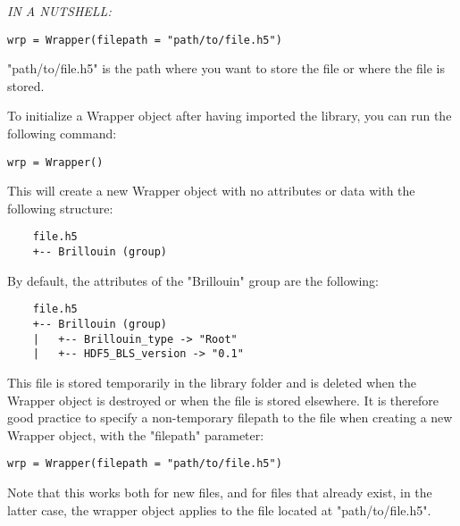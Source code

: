 \begin{tcolorbox}
\textit{IN A NUTSHELL:}
\begin{lstlisting}
wrp = Wrapper(filepath = "path/to/file.h5")
\end{lstlisting}
"path/to/file.h5" is the path where you want to store the file or where the file is stored.
\end{tcolorbox}


To initialize a Wrapper object after having imported the library, you can run the following command:
\begin{lstlisting}
wrp = Wrapper()
\end{lstlisting}

This will create a new Wrapper object with no attributes or data with the following structure:
\begin{verbatim}
    file.h5
    +-- Brillouin (group)
\end{verbatim}

By default, the attributes of the "Brillouin" group are the following:
\begin{verbatim}
    file.h5
    +-- Brillouin (group)
    |   +-- Brillouin_type -> "Root"
    |   +-- HDF5_BLS_version -> "0.1" 
\end{verbatim}

This file is stored temporarily in the library folder and is deleted when the Wrapper object is destroyed or when the file is stored elsewhere. It is therefore good practice to specify a non-temporary filepath to the file when creating a new Wrapper object, with the "filepath" parameter:
\begin{lstlisting}
wrp = Wrapper(filepath = "path/to/file.h5")
\end{lstlisting}
Note that this works both for new files, and for files that already exist, in the latter case, the wrapper object applies to the file located at "path/to/file.h5".
